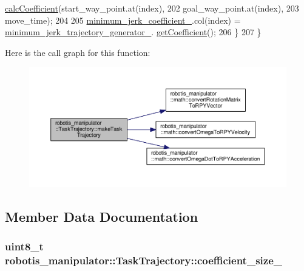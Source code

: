 \begin{DoxyCode}
      \hyperlink{classrobotis__manipulator_1_1_minimum_jerk_afd29204e588525a2688a74d2a9656354}{calcCoefficient}(start\_way\_point.at(index),
202                                     goal\_way\_point.at(index),
203                                     move\_time);
204 
205     \hyperlink{classrobotis__manipulator_1_1_task_trajectory_a19c6e0525c29db0b3bad7950baa74e42}{minimum\_jerk\_coefficient\_}.col(index) = 
      \hyperlink{classrobotis__manipulator_1_1_task_trajectory_aa616787d639765003bd054cc7c59f6d3}{minimum\_jerk\_trajectory\_generator\_}.
      \hyperlink{classrobotis__manipulator_1_1_minimum_jerk_a1610599c85567422e492e0893e02cc34}{getCoefficient}();
206   \}
207 \}
\end{DoxyCode}


Here is the call graph for this function\+:\nopagebreak
\begin{figure}[H]
\begin{center}
\leavevmode
\includegraphics[width=350pt]{classrobotis__manipulator_1_1_task_trajectory_a29e0ef8260a659d2ddbda835777690bc_cgraph}
\end{center}
\end{figure}




\subsection{Member Data Documentation}
\subsubsection[{\texorpdfstring{coefficient\+\_\+size\+\_\+}{coefficient_size_}}]{\setlength{\rightskip}{0pt plus 5cm}uint8\+\_\+t robotis\+\_\+manipulator\+::\+Task\+Trajectory\+::coefficient\+\_\+size\+\_\+\hspace{0.3cm}{\ttfamily [private]}}\hypertarget{classrobotis__manipulator_1_1_task_trajectory_a3e18bd8e5e8b327d15afd8831ba099f5}{}\label{classrobotis__manipulator_1_1_task_trajectory_a3e18bd8e5e8b327d15afd8831ba099f5}


